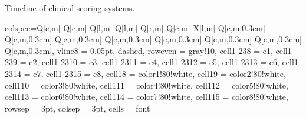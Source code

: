 \begin{table*}[ht!]
    \centering
    \caption{Timeline of clinical scoring systems.}

   \begin{threeparttable}
   \begin{tblr}[
    ]{
      colspec={Q[c,m]
               Q[c,m]
               Q[l,m]
               Q[l,m]
               Q[r,m]
               Q[c,m]
               X[l,m] %
               Q[c,m,0.3cm]
               Q[c,m,0.3cm]
               Q[c,m,0.3cm]
               Q[c,m,0.3cm]
               Q[c,m,0.3cm]
               Q[c,m,0.3cm]
               Q[c,m,0.3cm]
               Q[c,m,0.3cm]},
      vline{8} = {0.05pt, dashed},
      row{even} = {gray!10},
      cell{1-23}{8} = {c1},
      cell{1-23}{9} = {c2},
      cell{1-23}{10} = {c3},
      cell{1-23}{11} = {c4},
      cell{1-23}{12} = {c5},
      cell{1-23}{13} = {c6},
      cell{1-23}{14} = {c7},
      cell{1-23}{15} = {c8},
      cell{1}{8} = {color1!80!white},
      cell{1}{9} = {color2!80!white},
      cell{1}{10} = {color3!80!white},
      cell{1}{11} = {color4!80!white},
      cell{1}{12} = {color5!80!white},
      cell{1}{13} = {color6!80!white},
      cell{1}{14} = {color7!80!white},
      cell{1}{15} = {color8!80!white},
      rowsep = 3pt,
      colsep = 3pt,
      cells = {font=\fontsize{7}{8}\linespread{1.00}\selectfont} %
    }
    

\end{tblr}
\end{threeparttable}
\end{table*}
